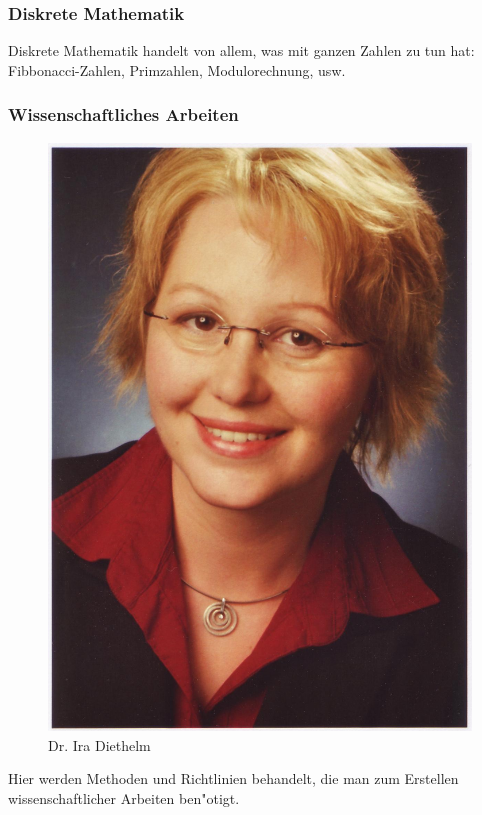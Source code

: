 \subsubsection{Diskrete Mathematik}

Diskrete Mathematik handelt von allem, was mit ganzen Zahlen zu tun hat: Fibbonacci-Zahlen, Primzahlen, Modulorechnung, usw.


\subsubsection{Wissenschaftliches Arbeiten}

\begin{figure}[h]
	\centering\includegraphics[width=0.7\linewidth]{bilder/dozenten/diethelm.jpg}\\
	{Dr. Ira Diethelm}
\end{figure}
Hier werden Methoden und Richtlinien behandelt, die man zum Erstellen
wissenschaftlicher Arbeiten ben"otigt.
